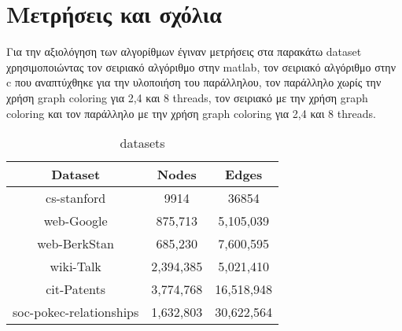 \documentclass[10p]{report}
\begin{document}
\section*{Μετρήσεις και σχόλια}

Για την αξιολόγηση των αλγορίθμων έγιναν μετρήσεις στα παρακάτω dataset χρησιμοποιώντας 
τον σειριακό αλγόριθμο στην matlab, τον σειριακό αλγόριθμο στην c που αναπτύχθηκε 
για την υλοποιήση του παράλληλου, τον παράλληλο χωρίς την χρήση graph coloring για 
2,4 και 8 threads, τον σειριακό με την χρήση graph coloring και τον παράλληλο με 
την χρήση graph coloring για 2,4 και 8 threads. 

\begin{table}[htbp]

\footnotesize{
        \begin{center}
        \begin{tabular}{| c | c | c |} \hline
                Dataset & Nodes & Edges \\ \hline
                cs-stanford & 9914 & 36854 \\ %
                web-Google & 875,713 & 5,105,039 \\ %
                web-BerkStan & 685,230 & 7,600,595 \\ %
                wiki-Talk & 2,394,385 & 5,021,410 \\ %
                cit-Patents & 3,774,768 & 16,518,948 \\ %
                soc-pokec-relationships & 1,632,803 & 30,622,564 \\ \hline
        \end{tabular}
                \caption{datasets}
        \end{center}
}
\end{table}

\end{document}
